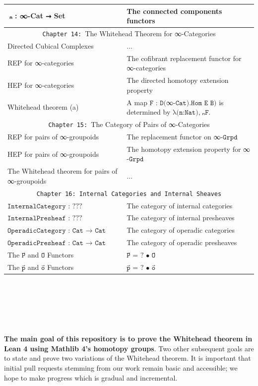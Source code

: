\documentclass{book}
\theoremstyle{definition}
\newcounter{pcounter}
\newcounter{sectioncount}
\newcounter{subsectioncount}
\renewcommand{\section}[1]{\newpage\ \\ \ \\ \begin{center} \scalebox{1.5}{\texttt{\thesectioncount . #1}} \stepcounter{sectioncount} \setcounter{subsectioncount}{1} \end{center} \begin{center} \ \\ \ \\ \thispagestyle{empty} \end{center}}
\begin{document}
{\begin{longtable}{|| l || l ||}
 \hline 
π⃗ₙ : ∞-Cat ⭢ Set & The connected components functors\\
 \hline \hline
 \multicolumn{2}{||c||}{\texttt{Chapter 14: }The Whitehead Theorem for ∞-Categories} \\
\hline \hline
Directed Cubical Complexes & ...\\
\hline
REP for ∞-categories & The cofibrant replacement functor for ∞-categories\\
\hline
HEP for ∞-categories & The directed homotopy extension property\\
\hline 
Whitehead theorem (a) & A map $\texttt{F : D(}$∞$\texttt{-Cat).Hom E B)}$ is determined by $\texttt{λ(n:Nat),}$π⃗ₙ$\texttt{F}$.\\
\hline \hline
\multicolumn{2}{||c||}{\texttt{Chapter 15: }The Category of Pairs of ∞-Categories} \\
\hline \hline
REP for pairs of ∞-groupoids & The replacement functor on ∞$\texttt{-Grpd}$ \\
\hline
HEP for pairs of ∞-groupoids & The homotopy extension property for ∞$\texttt{-Grpd}$\\
 \hline 
The Whitehead theorem for pairs of ∞-groupoids & ... \\
\hline \hline
\multicolumn{2}{||c||}{\texttt{Chapter 16: Internal Categories and Internal Sheaves}} \\
\hline \hline
 $\texttt{InternalCategory : ???}$   & The category of internal categories \\
 \hline
 $\texttt{InternalPresheaf : ???}$  & The category of internal presheaves \\
 \hline
  $\texttt{OperadicCategory : Cat → Cat}$  & The category of operadic categories  \\
 \hline
 $\texttt{OperadicPresheaf : Cat → Cat}$   & The category of operadic presheaves  \\
  \hline
  The $\texttt{P⃗}$ and $\texttt{O⃗}$ Functors & $\texttt{P⃗ = ? • O⃗}$ \\
 \hline
 The $\texttt{p⃗}$ and $\texttt{o⃗}$ Functors & $\texttt{p⃗ = ? • o⃗}$ \\
 \hline
\end{longtable}
}



\newpage
\section{Introduction}

{\bf The main goal of this repository is to prove the Whitehead theorem in Lean 4 using Mathlib 4's homotopy groups}. Two other subsequent goals are to state and prove two variations of the Whitehead theorem. It is important that initial pull requests stemming from our work remain basic and accessible; we hope to make progress which is gradual and incremental.\\
\end{document}

